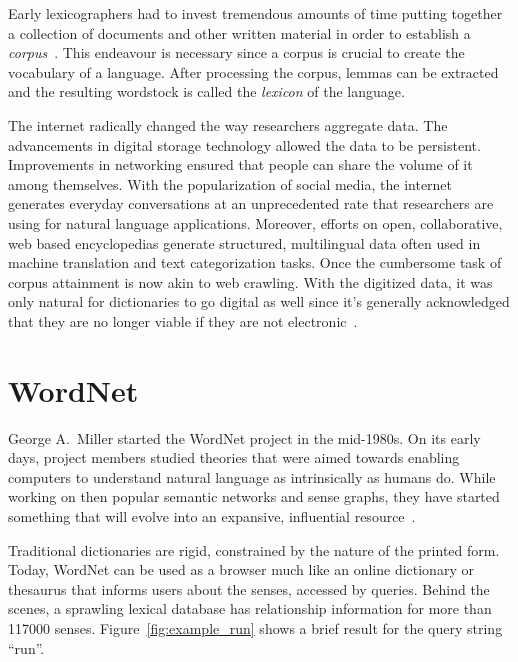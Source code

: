 Early lexicographers had to invest tremendous amounts of time putting together a collection of documents and other written material in order to establish a \emph{corpus}~\cite{uzun_1945ten_1999}.
This endeavour is necessary since a corpus is crucial to create the vocabulary of a language.
After processing the corpus, lemmas can be extracted and the resulting wordstock is called the \emph{lexicon} of the language.

The internet radically changed the way researchers aggregate data.
The advancements in digital storage technology allowed the data to be persistent.
Improvements in networking ensured that people can share the volume of it among themselves.
With the popularization of social media, the internet generates everyday conversations at an unprecedented rate that researchers are using for natural language applications. %
Moreover,  efforts on open, collaborative, web based encyclopedias generate structured, multilingual data often used in machine translation and text categorization tasks. %
Once the cumbersome task of corpus attainment is now akin to web crawling.
With the digitized data, it was only natural for dictionaries to go digital as well since it's generally acknowledged that they are no longer viable if they are not electronic~\cite{sterkenburg_practical_2003}.

\section{WordNet}%
\label{sec:wordnet}
George A.\ Miller started the WordNet project in the mid-1980s.
On its early days, project members studied theories that were aimed towards enabling computers to understand natural language as intrinsically as humans do.
While working on then popular semantic networks and sense graphs, they have started something that will evolve into an expansive, influential resource~\cite{fellbaum_wordnet_1998}.

Traditional dictionaries are rigid, constrained by the nature of the printed form.
Today, WordNet can be used as a browser much like an online dictionary or thesaurus that informs users about the senses, accessed by queries.
Behind the scenes, a sprawling lexical database has relationship information for more than 117000 senses. %
Figure~\ref{fig:example_run} shows a brief result for the query string \enquote{run}.

